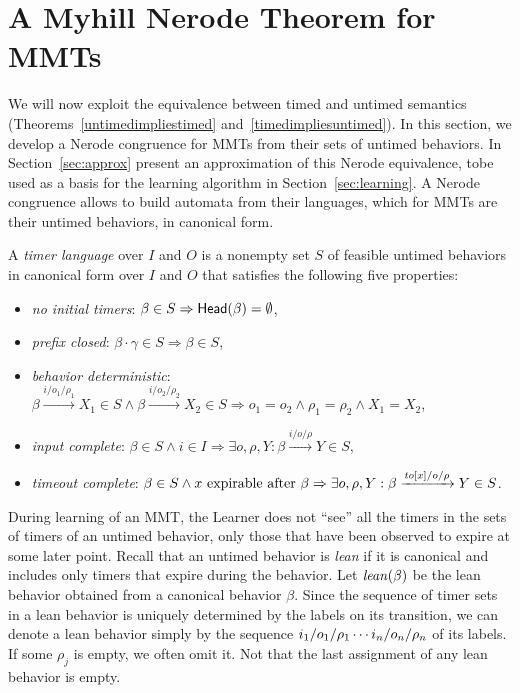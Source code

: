 \section{A Myhill Nerode Theorem for MMTs}
\label{sec:nerode}
\label{sec:bj-nerode}

We will now exploit the equivalence between timed and untimed semantics
(Theorems~\ref{untimedimpliestimed} and~\ref{timedimpliesuntimed}).
In this section, we develop a Nerode congruence for  MMTs
from their sets of untimed behaviors.
In Section~\ref{sec:approx} present an approximation of this
Nerode equivalence, tobe used as a basis for the learning algorithm in
Section~\ref{sec:learning}.
  A Nerode congruence allows to build automata from their languages, which for MMTs are their untimed behaviors, in canonical form.

\begin{definition}
\label{def:timer language}
A \emph{timer language} over $I$ and $O$ is a nonempty set 
$S$ of feasible untimed behaviors in canonical form over $I$ and $O$ that satisfies the following five properties:
\begin{itemize}
\item
\emph{no initial timers}: $\beta \in S \Rightarrow \mathsf{Head}({\beta}) = \emptyset$,
\item
\emph{prefix closed}: $\beta \cdot \gamma \in S \Rightarrow \beta \in S$,
\item
\emph{behavior deterministic}:
$\beta \xrightarrow{i/o_1/\rho_1} X_1 \in S \wedge \beta \xrightarrow{i/o_2/\rho_2} X_2 \in S \Rightarrow o_1 = o_2 \wedge \rho_1 = \rho_2 \wedge X_1 = X_2$,
\item
\emph{input complete}:
$\beta \in S \wedge i \in I \Rightarrow \exists o, \rho, Y : \beta \xrightarrow{i/o/\rho} Y \in S$,
\item
\emph{timeout complete}:
$\beta \in S \wedge x \mbox{ expirable after } \beta \Rightarrow
\exists o, \rho, Y: \beta \xrightarrow{\mathit{to}[x]/o/\rho} Y \in S$.
\end{itemize}
\end{definition}

During learning of an MMT, the Learner does not ``see'' all the timers
in the sets of timers of an untimed behavior, only those that have
been observed to expire at some later point. 
Recall that an untimed behavior is {\em lean} if it is canonical and
includes only timers that expire during the behavior.
Let $\mathit{lean}({\beta})$ be the lean behavior obtained from a canonical
behavior $\beta$.
Since the sequence of timer sets in a lean behavior is
uniquely determined by the labels on its transition, we can
denote a lean behavior simply by the sequence
$i_1/o_1/\rho_1 \cdots i_n/o_n/\rho_n$ of its labels.
If some $\rho_j$ is empty, we often omit it. Not that
the last assignment of any lean behavior is empty.

